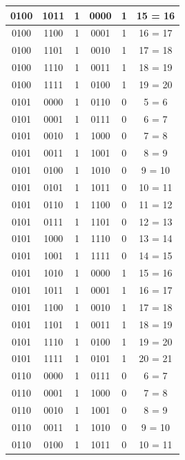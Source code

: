 \documentclass{exam}
\begin{document}
\begin{center}
\begin{longtable}{|c|c|c|c|c|c|}
                0100 & 1011 & 1 & 0000 & 1 & 15 = 16 \\ \hline
                0100 & 1100 & 1 & 0001 & 1 & 16 = 17 \\ \hline
                0100 & 1101 & 1 & 0010 & 1 & 17 = 18 \\ \hline
                0100 & 1110 & 1 & 0011 & 1 & 18 = 19 \\ \hline
                0100 & 1111 & 1 & 0100 & 1 & 19 = 20 \\ \hline
                0101 & 0000 & 1 & 0110 & 0 & 5 = 6 \\ \hline
                0101 & 0001 & 1 & 0111 & 0 & 6 = 7 \\ \hline
                0101 & 0010 & 1 & 1000 & 0 & 7 = 8 \\ \hline
                0101 & 0011 & 1 & 1001 & 0 & 8 = 9 \\ \hline
                0101 & 0100 & 1 & 1010 & 0 & 9 = 10 \\ \hline
                0101 & 0101 & 1 & 1011 & 0 & 10 = 11 \\ \hline
                0101 & 0110 & 1 & 1100 & 0 & 11 = 12 \\ \hline
                0101 & 0111 & 1 & 1101 & 0 & 12 = 13 \\ \hline
                0101 & 1000 & 1 & 1110 & 0 & 13 = 14 \\ \hline
                0101 & 1001 & 1 & 1111 & 0 & 14 = 15 \\ \hline
                0101 & 1010 & 1 & 0000 & 1 & 15 = 16 \\ \hline
                0101 & 1011 & 1 & 0001 & 1 & 16 = 17 \\ \hline
                0101 & 1100 & 1 & 0010 & 1 & 17 = 18 \\ \hline
                0101 & 1101 & 1 & 0011 & 1 & 18 = 19 \\ \hline
                0101 & 1110 & 1 & 0100 & 1 & 19 = 20 \\ \hline
                0101 & 1111 & 1 & 0101 & 1 & 20 = 21 \\ \hline
                0110 & 0000 & 1 & 0111 & 0 & 6 = 7 \\ \hline
                0110 & 0001 & 1 & 1000 & 0 & 7 = 8 \\ \hline
                0110 & 0010 & 1 & 1001 & 0 & 8 = 9 \\ \hline
                0110 & 0011 & 1 & 1010 & 0 & 9 = 10 \\ \hline
                0110 & 0100 & 1 & 1011 & 0 & 10 = 11 \\ \hline

\end{longtable}
\end{center}
\end{document}
